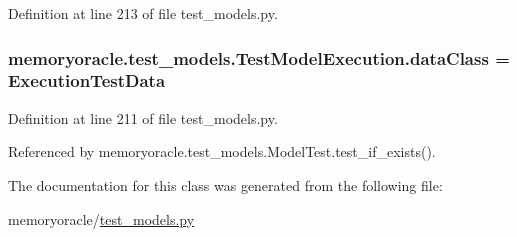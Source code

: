 Definition at line 213 of file test\+\_\+models.\+py.

\hypertarget{classmemoryoracle_1_1test__models_1_1TestModelExecution_a5802608a9ffa003553cee4e5b344918b}{}
\subsubsection[{data\+Class}]{\setlength{\rightskip}{0pt plus 5cm}memoryoracle.\+test\+\_\+models.\+Test\+Model\+Execution.\+data\+Class = {\bf Execution\+Test\+Data}\hspace{0.3cm}{\ttfamily [static]}}\label{classmemoryoracle_1_1test__models_1_1TestModelExecution_a5802608a9ffa003553cee4e5b344918b}


Definition at line 211 of file test\+\_\+models.\+py.



Referenced by memoryoracle.\+test\+\_\+models.\+Model\+Test.\+test\+\_\+if\+\_\+exists().



The documentation for this class was generated from the following file\+:\begin{DoxyCompactItemize}
\item 
memoryoracle/\hyperlink{test__models_8py}{test\+\_\+models.\+py}\end{DoxyCompactItemize}

